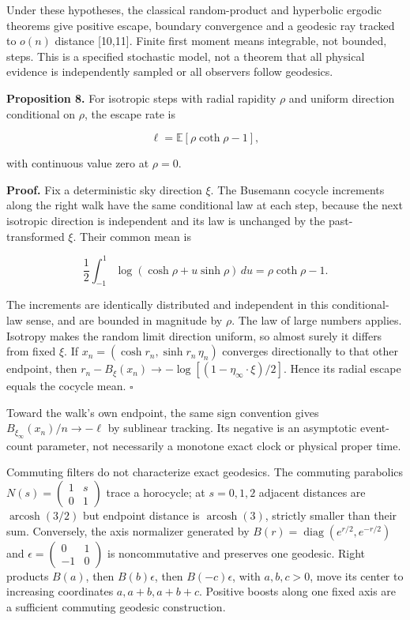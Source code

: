 \documentclass[
  11pt,
  a4paper,
]{article}
\begin{document}
Under these hypotheses, the classical random-product and hyperbolic ergodic theorems give positive escape, boundary convergence and a geodesic ray tracked to \(o(n)\) distance {[}10,11{]}. Finite first moment means integrable, not bounded, steps. This is a specified stochastic model, not a theorem that all physical evidence is independently sampled or all observers follow geodesics.

\textbf{Proposition 8.} For isotropic steps with radial rapidity \(\rho\) and uniform direction conditional on \(\rho\), the escape rate is

\[\ell=\mathbb E[\rho\coth\rho-1],\]

with continuous value zero at \(\rho=0\).

\textbf{Proof.} Fix a deterministic sky direction \(\xi\). The Busemann cocycle increments along the right walk have the same conditional law at each step, because the next isotropic direction is independent and its law is unchanged by the past-transformed \(\xi\). Their common mean is

\[\frac12\int_{-1}^1\log(\cosh\rho+u\sinh\rho)\,du
=\rho\coth\rho-1.\]

The increments are identically distributed and independent in this conditional-law sense, and are bounded in magnitude by \(\rho\). The law of large numbers applies. Isotropy makes the random limit direction uniform, so almost surely it differs from fixed \(\xi\). If \(x_n=(\cosh r_n,\sinh r_n\,\eta_n)\) converges directionally to that other endpoint, then \(r_n-B_\xi(x_n)\to-\log[(1-\eta_\infty\cdot\xi)/2]\). Hence its radial escape equals the cocycle mean. \(\square\)

Toward the walk's own endpoint, the same sign convention gives \(B_{\xi_\infty}(x_n)/n\to-\ell\) by sublinear tracking. Its negative is an asymptotic event-count parameter, not necessarily a monotone exact clock or physical proper time.

Commuting filters do not characterize exact geodesics. The commuting parabolics \(N(s)=\left(\begin{smallmatrix}1&s\\0&1\end{smallmatrix}\right)\) trace a horocycle; at \(s=0,1,2\) adjacent distances are \(\operatorname{arcosh}(3/2)\) but endpoint distance is \(\operatorname{arcosh}(3)\), strictly smaller than their sum. Conversely, the axis normalizer generated by \(B(r)=\operatorname{diag}(e^{r/2},e^{-r/2})\) and \(\epsilon=\left(\begin{smallmatrix}0&1\\-1&0\end{smallmatrix}\right)\) is noncommutative and preserves one geodesic. Right products \(B(a)\), then \(B(b)\epsilon\), then \(B(-c)\epsilon\), with \(a,b,c>0\), move its center to increasing coordinates \(a,a+b,a+b+c\). Positive boosts along one fixed axis are a sufficient commuting geodesic construction.
\end{document}
